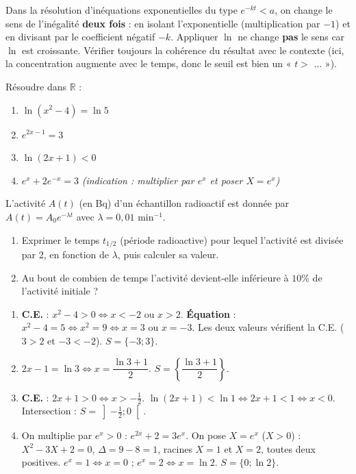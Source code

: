\documentclass[11pt]{article}
\newcounter{popsec}
\newcounter{popsub}
\newcommand{\courssub}[1]{%
  \stepcounter{popsub}%
  \par\vspace{9pt}\noindent{\popxbold\fontsize{11.5}{13}\selectfont\color{popink}{\color{poporange}\thepopsec.\thepopsub}\hspace{6pt}#1}\par\nopagebreak\vspace{4pt}
}
\begin{document}
\begin{attention}
Dans la résolution d'inéquations exponentielles du type $e^{-kt} < a$, on change le sens de l'inégalité \textbf{deux fois} : en isolant l'exponentielle (multiplication par $-1$) et en divisant par le coefficient négatif $-k$. Appliquer $\ln$ ne change \textbf{pas} le sens car $\ln$ est croissante. Vérifier toujours la cohérence du résultat avec le contexte (ici, la concentration augmente avec le temps, donc le seuil est bien un « $t >$ ... »).
\end{attention}

\courssub{Exercices d'entraînement}

\begin{exercice}
Résoudre dans $\mathbb{R}$ :
\begin{enumerate}
    \item $\ln(x^2 - 4) = \ln 5$
    \item $e^{2x-1} = 3$
    \item $\ln(2x+1) < 0$
    \item $e^x + 2e^{-x} = 3$ \quad \textit{(indication : multiplier par $e^x$ et poser $X=e^x$)}
\end{enumerate}
\end{exercice}

\begin{exercice}
L'activité $A(t)$ (en Bq) d'un échantillon radioactif est donnée par $A(t) = A_0 e^{-\lambda t}$ avec $\lambda = 0,01$ min$^{-1}$.
\begin{enumerate}
    \item Exprimer le temps $t_{1/2}$ (période radioactive) pour lequel l'activité est divisée par 2, en fonction de $\lambda$, puis calculer sa valeur.
    \item Au bout de combien de temps l'activité devient-elle inférieure à $10\%$ de l'activité initiale ?
\end{enumerate}
\end{exercice}

\begin{corrige}[Exercice 1]
\begin{enumerate}
    \item \textbf{C.E.} : $x^2-4>0 \iff x<-2$ ou $x>2$. \textbf{Équation} : $x^2-4=5 \iff x^2=9 \iff x=3$ ou $x=-3$. Les deux valeurs vérifient la C.E. ($3>2$ et $-3<-2$). $S=\{-3; 3\}$.
    \item $2x-1 = \ln 3 \iff x = \dfrac{\ln 3 + 1}{2}$. $S = \left\{\dfrac{\ln 3 + 1}{2}\right\}$.
    \item \textbf{C.E.} : $2x+1>0 \iff x>-\frac{1}{2}$. $\ln(2x+1) < \ln 1 \iff 2x+1 < 1 \iff x < 0$. Intersection : $S = \left]-\frac{1}{2}; 0\right[$.
    \item On multiplie par $e^x > 0$ : $e^{2x} + 2 = 3e^x$. On pose $X = e^x$ ($X>0$) : $X^2 - 3X + 2 = 0$, $\Delta = 9-8=1$, racines $X=1$ et $X=2$, toutes deux positives. $e^x=1 \iff x=0$ ; $e^x=2 \iff x=\ln 2$. $S=\{0; \ln 2\}$.
\end{enumerate}
\end{corrige}
\end{document}
